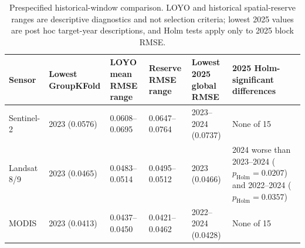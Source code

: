 \begin{table}[!htbp]\centering\scriptsize
\caption{Prespecified historical-window comparison. LOYO and historical spatial-reserve ranges are descriptive diagnostics and not selection criteria; lowest 2025 values are post hoc target-year descriptions, and Holm tests apply only to 2025 block RMSE.}\label{tab:windows}
\begin{tabularx}{.99\textwidth}{L{1.45cm}L{1.85cm}L{2.05cm}L{2.15cm}L{2.25cm}Y}\toprule
Sensor & Lowest GroupKFold & LOYO mean RMSE range & Reserve RMSE range & Lowest 2025 global RMSE & 2025 Holm-significant differences \\\midrule
Sentinel-2 & 2023 (0.0576) & 0.0608--0.0695 & 0.0647--0.0764 & 2023--2024 (0.0737) & None of 15 \\
Landsat 8/9 & 2023 (0.0465) & 0.0483--0.0514 & 0.0495--0.0512 & 2023 (0.0466) & 2024 worse than 2023--2024 ($p_{\mathrm{Holm}}=0.0207$) and 2022--2024 ($p_{\mathrm{Holm}}=0.0357$) \\
MODIS & 2023 (0.0413) & 0.0437--0.0450 & 0.0421--0.0462 & 2022--2024 (0.0428) & None of 15 \\\bottomrule
\end{tabularx}
\end{table}
